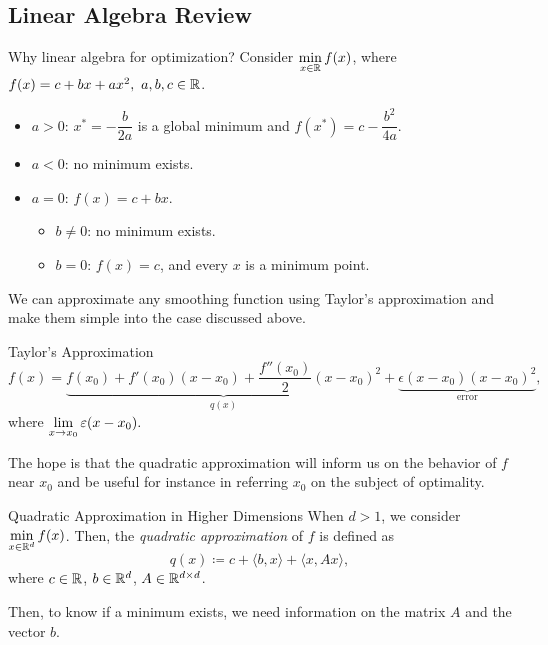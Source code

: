\subsection{Linear Algebra Review}
\begin{eg}{Why linear algebra for optimization?}
	Consider $\displaystyle\min_{x\in{\mathbb{R}}}f(x)$, where $f(x)=c+bx+ax^2,\ a,b,c\in{\mathbb{R}}$. 
	\begin{itemize}
		\item $a>0$: $x^*=-\dfrac{b}{2a}$ is a global minimum and $f(x^*)=c-\dfrac{b^2}{4a}$.
		\item $a<0$: no minimum exists.
		\item $a=0$: $f(x)=c+bx$.
		\begin{itemize}
			\item $b\neq0$: no minimum exists.
			\item $b=0$: $f(x)=c$, and every $x$ is a minimum point.
		\end{itemize}
	\end{itemize}
	We can approximate any smoothing function using Taylor's approximation and make them simple into the case discussed above. 
\end{eg}
\begin{thm}{Taylor's Approximation}
	\[f(x)=\underbrace{f(x_0)+f'(x_0)(x-x_0)+\dfrac{f''(x_0)}{2}(x-x_0)^2}_{q(x)}+\underbrace{\epsilon(x-x_0)(x-x_0)^2}_\text{error},\] where $\displaystyle\lim_{x\to x_0}\varepsilon(x-x_0).$
\end{thm}
\begin{rmk}
	The hope is that the quadratic approximation will inform us on the behavior of $f$ near $x_0$	and be useful for instance in referring $x_0$ on the subject of optimality. 
\end{rmk}
\begin{df}{Quadratic Approximation in Higher Dimensions}
	When $d>1$, we consider $\displaystyle\min_{x\in{\mathbb{R}}^d}f(x)$. Then, the \textit{quadratic approximation} of $f$ is defined as \[q(x)\coloneqq c+\langle b,x\rangle+\langle x,Ax\rangle,\] where $c\in{\mathbb{R}}$, $b\in{\mathbb{R}}^d$, $A\in{\mathbb{R}}^{d\times d}$.
\end{df}
\begin{rmk}
	Then, to know if a minimum exists, we need information on the matrix $A$ and the vector $b$.	
\end{rmk}
